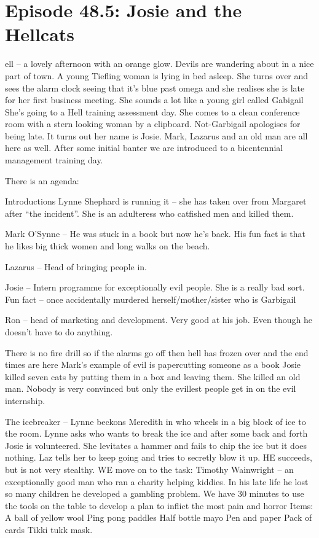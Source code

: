 \section{Episode 48.5: Josie and the Hellcats}

\medskip

ell – a lovely afternoon with an orange glow. Devils are wandering about in a nice part of town. A young Tiefling woman is lying in bed asleep. She turns over and sees the alarm clock seeing that it’s blue past omega and she realises she is late for her first business meeting. She sounds a lot like a young girl called Gabigail She’s going to a Hell training assessment day. She comes to a clean conference room with a stern looking woman by a clipboard. Not-Garbigail apologises for being late. It turns out her name is Josie. Mark, Lazarus and an old man are all here as well. After some initial banter we are introduced to a bicentennial management training day. \medskip

There is an agenda:\medskip

Introductions Lynne Shephard is running it – she has taken over from Margaret after “the incident”. She is an adulteress who catfished men and killed them.\medskip

Mark O’Synne – He was stuck in a book but now he’s back. His fun fact is that he likes big thick women and long walks on the beach.\medskip

Lazarus – Head of bringing people in.\medskip

Josie – Intern programme for exceptionally evil people. She is a really bad sort. Fun fact – once accidentally murdered herself/mother/sister who is Garbigail\medskip

Ron – head of marketing and development. Very good at his job. Even though he doesn’t have to do anything.\medskip

There is no fire drill so if the alarms go off then hell has frozen over and the end times are here Mark’s example of evil is papercutting someone as a book Josie killed seven cats by putting them in a box and leaving them. She killed an old man. Nobody is very convinced but only the evillest people get in on the evil internship. \medskip

The icebreaker – Lynne beckons Meredith in who wheels in a big block of ice to the room. Lynne asks who wants to break the ice and after some back and forth Josie is volunteered. She levitates a hammer and fails to chip the ice but it does nothing. Laz tells her to keep going and tries to secretly blow it up. HE succeeds, but is not very stealthy. WE move on to the task: Timothy Wainwright – an exceptionally good man who ran a charity helping kiddies. In his late life he lost so many children he developed a gambling problem. We have 30 minutes to use the tools on the table to develop a plan to inflict the most pain and horror Items: A ball of yellow wool Ping pong paddles Half bottle mayo Pen and paper Pack of cards Tikki tukk mask. \medskip

